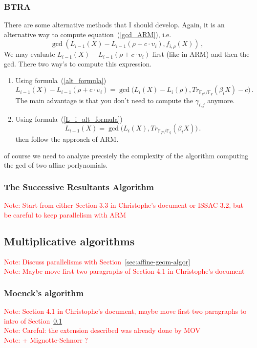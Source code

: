 \documentclass{article}
\newcommand{\ff}[1]{\mathbb{F}_{#1}}
\newcommand{\qq}{q}
\newcommand{\nn}{n}
\newcommand{\qn}{{\qq^\nn}}
\newcommand{\basef}{\ff{\qq}}
\newcommand{\extf}{\ff{\qn}}
\newcounter{algo}
\newcommand{\Notes}[1]{\textcolor{red}{Note: #1}}
\begin{document}
\subsubsection{BTRA}


There are some alternative methods that I should develop. Again, it is an alternative way to compute equation~(\ref{gcd_ARM}), i.e.
$$\gcd(L_{i-1}(X)-L_{i-1}(\rho + c \cdot \upsilon_i),f_{i,\rho}(X)) \,,$$
We may evaluate $L_{i-1}(X)-L_{i-1}(\rho + c \cdot \upsilon_i)$ first (like in ARM) and then the gcd. There two way's to compute this expression.
\begin{enumerate}
\item Using formula~(\ref{alt_formula})
$$
L_{i-1}(X)-L_{i-1}(\rho +c \cdot \upsilon_i)=
\gcd\bigl(L_i(X)-L_i(\rho), Tr_{\extf/\basef}(\beta_i X) -c  \bigr) \,.$$
The main advantage is that you don't need to compute the $\gamma_{i,j}$ anymore.
\item Using formula~(\ref{L_i_alt_formula})
$$ L_{i-1}(X)=\gcd\bigl(L_i(X),Tr_{\extf/\basef}(\beta_i X )\bigr) \,.$$
 then follow the approach of ARM.
\end{enumerate}
of course we need to analyze precsiely the complexity of the algorithm computing the gcd of two affine porlynomials.


\subsubsection{The Successive Resultants Algorithm}
\label{sec:SRA}
\Notes{Start from either Section 3.3 in Christophe's document or ISSAC 3.2, but be careful to keep parallelism with ARM}












\subsection{Multiplicative algorithms}
\label{sec:mult-algor}
\Notes{Discuss parallelisms with Section~\ref{sec:affine-geom-algor}}\\
\noindent\Notes{Maybe move first two paragraphs of Section 4.1 in Christophe's document}

\subsubsection{Moenck's algorithm}
\label{sec:Moenck}
\Notes{Section 4.1 in Christophe's document, maybe move first two paragraphs to intro of Section~\ref{sec:mult-algor}}\\
\noindent \Notes{Careful: the extension described was already done by MOV}\\
\noindent\Notes{+ Mignotte-Schnorr ?}
\end{document}

